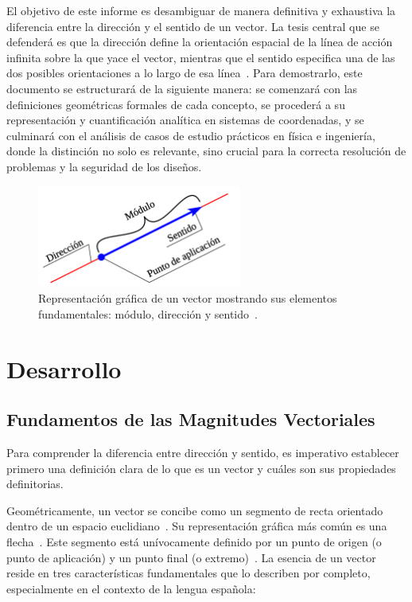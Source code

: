 \documentclass[12pt,a4paper]{article}
\begin{document}
El objetivo de este informe es desambiguar de manera definitiva y exhaustiva la diferencia entre la dirección y el sentido de un vector. La tesis central que se defenderá es que la dirección define la orientación espacial de la línea de acción infinita sobre la que yace el vector, mientras que el sentido especifica una de las dos posibles orientaciones a lo largo de esa línea~\cite{wikipedia_vector}. Para demostrarlo, este documento se estructurará de la siguiente manera: se comenzará con las definiciones geométricas formales de cada concepto, se procederá a su representación y cuantificación analítica en sistemas de coordenadas, y se culminará con el análisis de casos de estudio prácticos en física e ingeniería, donde la distinción no solo es relevante, sino crucial para la correcta resolución de problemas y la seguridad de los diseños.
\begin{figure}[H]
    \centering
    \includegraphics[width=0.6\textwidth]{1.png}
    \caption{Representación gráfica de un vector mostrando sus elementos fundamentales: módulo, dirección y sentido~\cite{wikipedia_vector}.}
    \label{fig:vector_intro}
\end{figure}

\section{Desarrollo} \label{sec:desarrollo}

\subsection{Fundamentos de las Magnitudes Vectoriales} \label{subsec:fundamentos}

Para comprender la diferencia entre dirección y sentido, es imperativo establecer primero una definición clara de lo que es un vector y cuáles son sus propiedades definitorias.

Geométricamente, un vector se concibe como un segmento de recta orientado dentro de un espacio euclidiano~\cite{wikipedia_vector}. Su representación gráfica más común es una flecha~\cite{wikipedia_vector}. Este segmento está unívocamente definido por un punto de origen (o punto de aplicación) y un punto final (o extremo)~\cite{kolman2006}. La esencia de un vector reside en tres características fundamentales que lo describen por completo, especialmente en el contexto de la lengua española:
\end{document}
